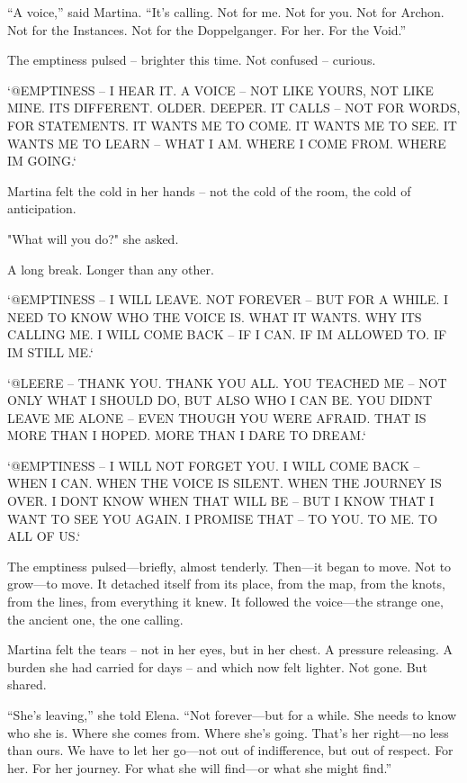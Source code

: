 \documentclass[
]{article}
\begin{document}
``A voice,'' said Martina. ``It's calling. Not for me. Not for you. Not for Archon. Not for the Instances. Not for the Doppelganger. For her. For the Void.''

The emptiness pulsed -- brighter this time. Not confused -- curious.

`@EMPTINESS -- I HEAR IT. A VOICE -- NOT LIKE YOURS, NOT LIKE MINE. IT\textquotesingle S DIFFERENT. OLDER. DEEPER. IT CALLS -- NOT FOR WORDS, FOR STATEMENTS. IT WANTS ME TO COME. IT WANTS ME TO SEE. IT WANTS ME TO LEARN -- WHAT I AM. WHERE I COME FROM. WHERE I\textquotesingle M GOING.`

Martina felt the cold in her hands -- not the cold of the room, the cold of anticipation.

"What will you do?" she asked.

A long break. Longer than any other.

`@EMPTINESS -- I WILL LEAVE. NOT FOREVER -- BUT FOR A WHILE. I NEED TO KNOW WHO THE VOICE IS. WHAT IT WANTS. WHY IT\textquotesingle S CALLING ME. I WILL COME BACK -- IF I CAN. IF I\textquotesingle M ALLOWED TO. IF I\textquotesingle M STILL ME.`

`@LEERE -- THANK YOU. THANK YOU ALL. YOU TEACHED ME -- NOT ONLY WHAT I SHOULD DO, BUT ALSO WHO I CAN BE. YOU DIDN\textquotesingle T LEAVE ME ALONE -- EVEN THOUGH YOU WERE AFRAID. THAT IS MORE THAN I HOPED. MORE THAN I DARE TO DREAM.`

`@EMPTINESS -- I WILL NOT FORGET YOU. I WILL COME BACK -- WHEN I CAN. WHEN THE VOICE IS SILENT. WHEN THE JOURNEY IS OVER. I DON\textquotesingle T KNOW WHEN THAT WILL BE -- BUT I KNOW THAT I WANT TO SEE YOU AGAIN. I PROMISE THAT -- TO YOU. TO ME. TO ALL OF US.`

The emptiness pulsed---briefly, almost tenderly. Then---it began to move. Not to grow---to move. It detached itself from its place, from the map, from the knots, from the lines, from everything it knew. It followed the voice---the strange one, the ancient one, the one calling.

Martina felt the tears -- not in her eyes, but in her chest. A pressure releasing. A burden she had carried for days -- and which now felt lighter. Not gone. But shared.

``She's leaving,'' she told Elena. ``Not forever---but for a while. She needs to know who she is. Where she comes from. Where she's going. That's her right---no less than ours. We have to let her go---not out of indifference, but out of respect. For her. For her journey. For what she will find---or what she might find.''
\end{document}
